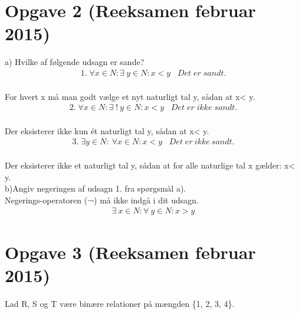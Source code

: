 \documentclass{article}
\begin{document}
\section{Opgave 2 (Reeksamen februar 2015)}
a)\; Hvilke af følgende udsagn er sande?
\\
\begin{align*}
1.\; \forall x \in N:\exists\:y \in N: x< y \;\;\;Det\;er\;sandt.
\end{align*}
\\
For hvert x må man godt vælge et nyt naturligt tal y, sådan at x< y.
\\
\begin{align*}
2.\; \forall x \in N:\exists\;!\:y \in N: x< y \;\;\;Det\;er\;ikke\;sandt. 
\end{align*}
\\
Der eksisterer ikke kun ét naturligt tal y, sådan at x< y. 
\\
\begin{align*}
3.\; \exists y \in N:\:\forall x \in N: x< y \;\;\;Det\;er\:ikke \:sandt. 
\end{align*}
\\
Der eksisterer ikke et naturligt tal y, sådan at for alle naturlige tal x gælder: x< y.
\\
\newline
b)\;Angiv negeringen af udsagn 1. fra spørgsmål a).\\\newline Negerings-operatoren (¬) må ikke indgå i dit udsagn.
 \begin{align*}
\exists\: x \in N:\forall\:y \in N: x > y
\end{align*}

\section{Opgave 3 (Reeksamen februar 2015)}
Lad R, S og T være binære relationer på mængden \{1, 2, 3, 4\}.
\end{document}
